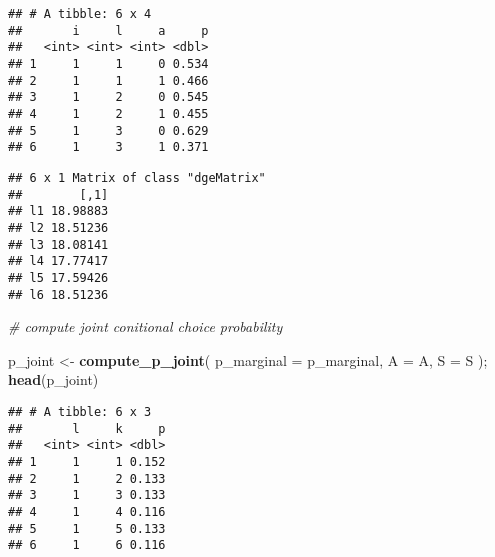 \documentclass[
]{book}
\newenvironment{Shaded}{\begin{snugshade}}{\end{snugshade}}
\newcommand{\AttributeTok}[1]{\textcolor[rgb]{0.13,0.29,0.53}{#1}}
\newcommand{\CommentTok}[1]{\textcolor[rgb]{0.56,0.35,0.01}{\textit{#1}}}
\newcommand{\FunctionTok}[1]{\textcolor[rgb]{0.13,0.29,0.53}{\textbf{#1}}}
\newcommand{\NormalTok}[1]{#1}
\newcommand{\OtherTok}[1]{\textcolor[rgb]{0.56,0.35,0.01}{#1}}
\newcommand{\SpecialCharTok}[1]{\textcolor[rgb]{0.81,0.36,0.00}{\textbf{#1}}}
\newcommand{\StringTok}[1]{\textcolor[rgb]{0.31,0.60,0.02}{#1}}
\begin{document}
\begin{Shaded}
\end{Shaded}

\begin{verbatim}
## # A tibble: 6 x 4
##       i     l     a     p
##   <int> <int> <int> <dbl>
## 1     1     1     0 0.534
## 2     1     1     1 0.466
## 3     1     2     0 0.545
## 4     1     2     1 0.455
## 5     1     3     0 0.629
## 6     1     3     1 0.371
\end{verbatim}

\begin{Shaded}
\end{Shaded}

\begin{verbatim}
## 6 x 1 Matrix of class "dgeMatrix"
##        [,1]
## l1 18.98883
## l2 18.51236
## l3 18.08141
## l4 17.77417
## l5 17.59426
## l6 18.51236
\end{verbatim}

\begin{Shaded}
\begin{Highlighting}[]
\CommentTok{\# compute joint conitional choice probability}

\NormalTok{p\_joint }\OtherTok{\textless{}{-}} 
  \FunctionTok{compute\_p\_joint}\NormalTok{(}
    \AttributeTok{p\_marginal =}\NormalTok{ p\_marginal, }
    \AttributeTok{A =}\NormalTok{ A, }
    \AttributeTok{S =}\NormalTok{ S}
\NormalTok{    );}
\FunctionTok{head}\NormalTok{(p\_joint)}
\end{Highlighting}
\end{Shaded}

\begin{verbatim}
## # A tibble: 6 x 3
##       l     k     p
##   <int> <int> <dbl>
## 1     1     1 0.152
## 2     1     2 0.133
## 3     1     3 0.133
## 4     1     4 0.116
## 5     1     5 0.133
## 6     1     6 0.116
\end{verbatim}
\end{document}
